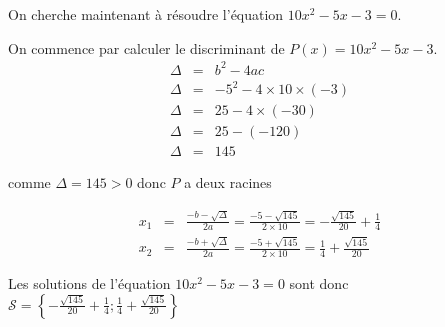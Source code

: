 \documentclass[a4paper,10pt]{article}
\begin{document}
    On cherche maintenant à résoudre l'équation $10 x^{  2 } - 5 x - 3 = 0$.
    
    

    On commence par calculer le discriminant de $P(x) = 10 x^{  2 } - 5 x - 3$.
    \begin{eqnarray*}
        \Delta & = & b^2-4ac \\
        \Delta & = & -5^{  2 } - 4 \times 10 \times ( -3 ) \\ 
\Delta & = & 25 - 4 \times ( -30 ) \\ 
\Delta & = & 25 - ( -120 ) \\ 
\Delta & = & 145
    \end{eqnarray*}

    
    comme $\Delta = 145 > 0$ donc $P$ a deux racines

    \begin{eqnarray*}
        x_1 & = & \frac{-b - \sqrt{\Delta}}{2a} =  \frac{-5 - \sqrt{145}}{2 \times 10} = - \frac{\sqrt{145}}{20} + \frac{1}{4} \\
        x_2 & = & \frac{-b + \sqrt{\Delta}}{2a} =  \frac{-5 + \sqrt{145}}{2 \times 10} = \frac{1}{4} + \frac{\sqrt{145}}{20}
    \end{eqnarray*}

    Les solutions de l'équation $10 x^{  2 } - 5 x - 3 = 0$ sont donc $\mathcal{S} = \left\{ - \frac{\sqrt{145}}{20} + \frac{1}{4}; \frac{1}{4} + \frac{\sqrt{145}}{20} \right\}$

    
\end{document}
